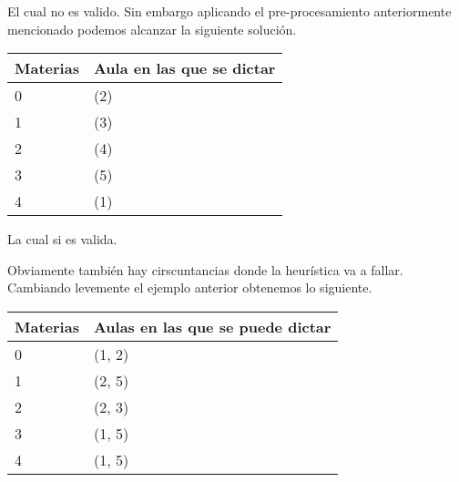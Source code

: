 El cual no es valido. Sin embargo aplicando el pre-procesamiento anteriormente mencionado podemos alcanzar la siguiente solución.

\begin{table}[H]
\begin{center}
\begin{tabular}{|l|l|}
\hline
Materias & Aula en las que se dictar \\
\hline \hline
0 & (2) \\ \hline
1 & (3) \\ \hline
2 & (4) \\ \hline
3 & (5) \\ \hline
4 & (1) \\ \hline
\end{tabular}
\end{center}
\end{table}

La cual si es valida.

Obviamente también hay cirscuntancias donde la heurística va a fallar. Cambiando levemente el ejemplo anterior obtenemos lo siguiente.



\begin{table}[H]
\begin{center}
\begin{tabular}{|l|l|}
\hline
Materias & Aulas en las que se puede dictar \\
\hline \hline
0 & (1, 2) \\ \hline
1 & (2, 5) \\ \hline
2 & (2, 3) \\ \hline
3 & (1, 5) \\ \hline
4 & (1, 5) \\ \hline
\end{tabular}
\end{center}
\end{table}

